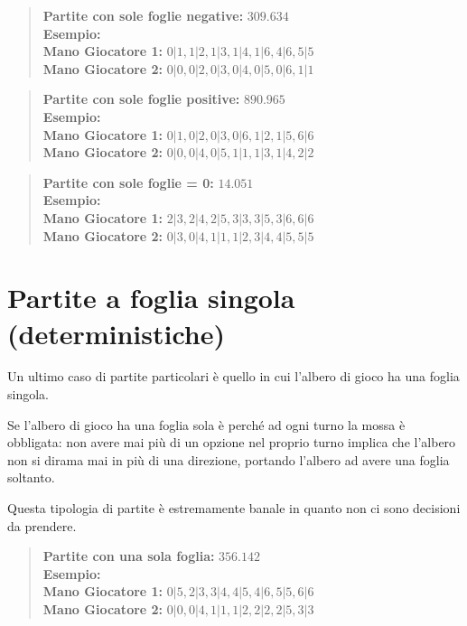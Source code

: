 \documentclass[a4paper,12pt]{report}
\begin{document}
\begin{quote}
    \textbf{Partite con sole foglie negative:} \(309.634\)\\
    \textbf{Esempio:} \(\)\\
    \textbf{Mano Giocatore 1:} \(0|1, 1|2, 1|3, 1|4, 1|6, 4|6, 5|5\)\\
    \textbf{Mano Giocatore 2:} \(0|0, 0|2, 0|3, 0|4, 0|5, 0|6, 1|1\)
\end{quote}


\begin{quote}
    \textbf{Partite con sole foglie positive:} \(890.965\)\\
    \textbf{Esempio:} \(\)\\
    \textbf{Mano Giocatore 1:} \(0|1, 0|2, 0|3, 0|6, 1|2, 1|5, 6|6\)\\
    \textbf{Mano Giocatore 2:} \(0|0, 0|4, 0|5, 1|1, 1|3, 1|4, 2|2\)
\end{quote}


\begin{quote}
    \textbf{Partite con sole foglie = 0:} \(14.051 \)\\
    \textbf{Esempio:} \(\)\\
    \textbf{Mano Giocatore 1:} \(2|3, 2|4, 2|5, 3|3, 3|5, 3|6, 6|6\)\\
    \textbf{Mano Giocatore 2:} \(0|3, 0|4, 1|1, 1|2, 3|4, 4|5, 5|5\)
\end{quote}



\section{Partite a foglia singola (deterministiche)}

Un ultimo caso di partite particolari è quello in cui l'albero di gioco ha una foglia singola.

Se l'albero di gioco ha una foglia sola è perché ad ogni turno la mossa è obbligata: non avere mai più di un opzione nel proprio turno implica che l'albero non si dirama mai in più di una direzione, portando l'albero ad avere una foglia soltanto.

Questa tipologia di partite è estremamente banale in quanto non ci sono decisioni da prendere.

\begin{quote}
    \textbf{Partite con una sola foglia:} \(356.142\)\\
    \textbf{Esempio:} \(\)\\
    \textbf{Mano Giocatore 1:} \(0|5, 2|3, 3|4, 4|5, 4|6, 5|5, 6|6\)\\
    \textbf{Mano Giocatore 2:} \(0|0, 0|4, 1|1, 1|2, 2|2, 2|5, 3|3\)
\end{quote}
\end{document}
